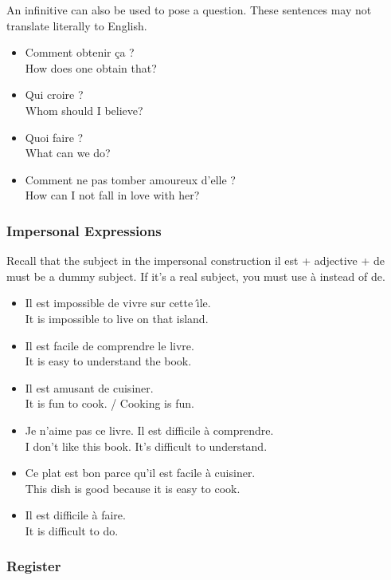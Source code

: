 An infinitive can also be used to pose a question. These sentences may not translate literally to English.

\begin{itemize}
  \item  Comment obtenir ça ? \\ How does one obtain that?
	\item  Qui croire ? \\ Whom should I believe?
	\item  Quoi faire ? \\ What can we do?
	\item  Comment ne pas tomber amoureux d'elle ? \\ How can I not fall in love with her?
\end{itemize}

\subsubsection{Impersonal Expressions}

Recall that the subject in the impersonal construction il est + adjective + de must be a dummy subject. If it's a real subject, you must use {\`a} instead of de.

\begin{itemize}
  \item  Il est impossible de vivre sur cette {\^\i}le. \\ It is impossible to live on that island.
	\item  Il est facile de comprendre le livre. \\ It is easy to understand the book.
	\item  Il est amusant de cuisiner. \\ It is fun to cook. / Cooking is fun.
	\item  Je n'aime pas ce livre. Il est difficile {\`a} comprendre. \\ I don't like this book. It's difficult to understand.
	\item  Ce plat est bon parce qu'il est facile {\`a} cuisiner. \\ This dish is good because it is easy to cook.
	\item  Il est difficile {\`a} faire. \\ It is difficult to do.
\end{itemize}

\subsubsection{Register}

